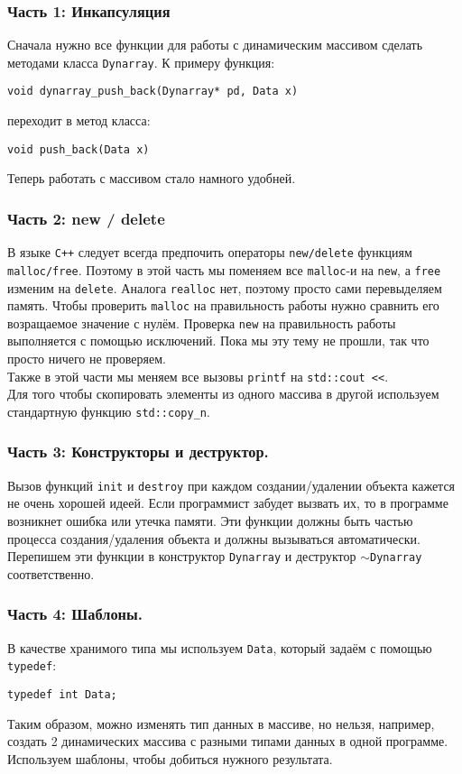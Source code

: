 \documentclass{article}
\begin{document}
\subsubsection*{Часть 1: Инкапсуляция}
Сначала нужно все функции для работы с динамическим массивом сделать методами класса \texttt{Dynarray}. К примеру функция:
\begin{lstlisting}
void dynarray_push_back(Dynarray* pd, Data x)
\end{lstlisting}
переходит в метод класса:
\begin{lstlisting}
void push_back(Data x)
\end{lstlisting}
Теперь работать с массивом стало намного удобней.
\subsubsection*{Часть 2: new / delete}
В языке \texttt{C++} следует всегда предпочить операторы \texttt{new/delete} функциям \texttt{malloc/free}. Поэтому в этой часть мы поменяем все \texttt{malloc}-и на \texttt{new}, а \texttt{free} изменим на \texttt{delete}. Аналога \texttt{realloc} нет, поэтому просто сами перевыделяем память. Чтобы проверить \texttt{malloc} на правильность работы нужно сравнить его возращаемое значение с нулём. Проверка \texttt{new} на правильность работы выполняется с помощью исключений. Пока мы эту тему не прошли, так что просто ничего не проверяем.
\\
Также в этой части мы меняем все вызовы \texttt{printf} на \texttt{std::cout <{}<}. \\Для того чтобы скопировать элементы из одного массива в другой используем стандартную функцию \texttt{std::copy\_n}.

\subsubsection*{Часть 3: Конструкторы и деструктор.}
Вызов функций \texttt{init} и \texttt{destroy} при каждом создании/удалении объекта кажется не очень хорошей идеей. Если программист забудет вызвать их, то в программе возникнет ошибка или утечка памяти. Эти функции должны быть частью процесса создания/удаления объекта и должны вызываться автоматически. Перепишем эти функции в конструктор \texttt{Dynarray} и деструктор \texttt{$\sim$Dynarray} соответственно.

\subsubsection*{Часть 4: Шаблоны.}
В качестве хранимого типа мы используем \texttt{Data}, который задаём с помощью \texttt{typedef}:
\begin{lstlisting}
typedef int Data;
\end{lstlisting}
Таким образом, можно изменять тип данных в массиве, но нельзя, например, создать 2 динамических массива с разными типами данных в одной программе. Используем шаблоны, чтобы добиться нужного результата.\\
\end{document}
